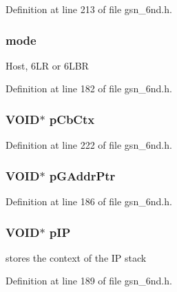 Definition at line 213 of file gsn\_\-6nd.h.

\hypertarget{a00194_a7d61d79fa98a45545166420dec0d8f3d}{
\subsubsection[{mode}]{ {\bf mode}}}
\label{a00194_a7d61d79fa98a45545166420dec0d8f3d}
Host, 6LR or 6LBR 

Definition at line 182 of file gsn\_\-6nd.h.

\hypertarget{a00194_a040e2d4627baec5f0f81086400c1b66a}{
\subsubsection[{pCbCtx}]{\setlength{\rightskip}{0pt plus 5cm}VOID$\ast$ {\bf pCbCtx}}}
\label{a00194_a040e2d4627baec5f0f81086400c1b66a}


Definition at line 222 of file gsn\_\-6nd.h.

\hypertarget{a00194_a44c82515db2c87ec5847d9e72695ade0}{
\subsubsection[{pGAddrPtr}]{\setlength{\rightskip}{0pt plus 5cm}VOID$\ast$ {\bf pGAddrPtr}}}
\label{a00194_a44c82515db2c87ec5847d9e72695ade0}


Definition at line 186 of file gsn\_\-6nd.h.

\hypertarget{a00194_aea015861cc964f97c61cc651f155451e}{
\subsubsection[{pIP}]{\setlength{\rightskip}{0pt plus 5cm}VOID$\ast$ {\bf pIP}}}
\label{a00194_aea015861cc964f97c61cc651f155451e}
stores the context of the IP stack 

Definition at line 189 of file gsn\_\-6nd.h.

